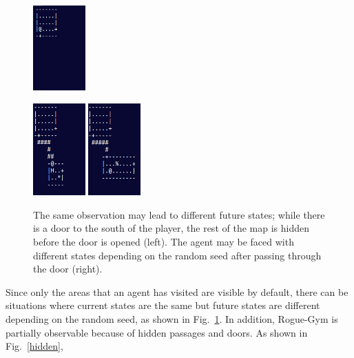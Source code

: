 \documentclass[conference]{IEEEtran}
\begin{document}
\begin{figure}[t]
  \begin{minipage}[cbt]{3cm}
   \centering
   \includegraphics[width=2cm]{pictures/initial.png}
  \end{minipage}
  \begin{minipage}[cbt]{6cm}
    \centering
    \includegraphics[width=2cm]{pictures/next1.png}
    \includegraphics[width=2cm]{pictures/next2.png}
  \end{minipage}
 \caption{The same observation may lead to different future states;
   while there is a door to
   the south of the player, the rest of the map is hidden before
   the door is opened (left).  The agent may be faced with different states 
   depending on the random seed after passing through the door (right).}
 \label{states}
\end{figure}
Since only the areas that an agent has visited are visible by default,
there can be situations where current states are the same but future
states are different depending on the random seed, as shown in
Fig.~\ref{states}.
In addition, Rogue-Gym is partially observable because of hidden
passages and doors. As shown in Fig.~\ref{hidden},
\end{document}
